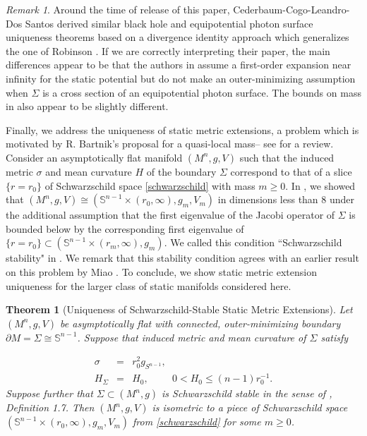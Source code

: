 \documentclass[12pt,twoside]{article}
\theoremstyle{plain}
\newtheorem{theorem}{Theorem}[section]
\theoremstyle{definition}
\theoremstyle{remark}
\newtheorem*{remark}{Remark}
\numberwithin{equation}{section}
\begin{document}
\begin{remark}
Around the time of release of this paper, Cederbaum-Cogo-Leandro-Dos Santos \cite{CCLS24} derived similar black hole and equipotential photon surface uniqueness theorems based on a divergence identity approach which generalizes the one of Robinson \cite{R78}. If we are correctly interpreting their paper, the main differences appear to be that the authors in \cite{CCLS24} assume a first-order expansion near infinity for the static potential but do not make an outer-minimizing assumption when $\Sigma$ is a cross section of an equipotential photon surface. The bounds on mass in \cite{CCLS24} also appear to be slightly different.
\end{remark}
Finally, we address the uniqueness of static metric extensions, a problem which is motivated by R. Bartnik's proposal for a quasi-local mass-- see \cite{Bar03} for a review. Consider an asymptotically flat manifold $(M^{n},g,V)$ such that the induced metric $\sigma$ and mean curvature $H$ of the boundary $\Sigma$ correspond to that of a slice $\{ r = r_{0}\}$ of Schwarzschild space \eqref{schwarzschild} with mass $m \geq 0$. In \cite{HW}, we showed that $(M^{n},g,V) \cong (\mathbb{S}^{n-1} \times (r_{0}, \infty), g_{m},V_{m})$ in dimensions less than $8$ under the additional assumption that the first eigenvalue of the Jacobi operator of $\Sigma$ is bounded below by the corresponding first eigenvalue of $\{r = r_{0} \} \subset (\mathbb{S}^{n-1} \times (r_{m},\infty), g_{m})$. We called this condition ``Schwarzschild stability" in \cite{HW}. We remark that this stability condition agrees with an earlier result on this problem by Miao \cite{boundary_effects}. To conclude, we show static metric extension uniqueness for the larger class of static manifolds considered here.
\begin{theorem}[Uniqueness of Schwarzschild-Stable Static Metric Extensions] \label{static_extension}
Let $(M^{n},g,V)$ be asymptotically flat  with connected, outer-minimizing boundary $\partial M=\Sigma \cong \mathbb{S}^{n-1}$. Suppose that induced metric and mean curvature of $\Sigma$ satisfy

\begin{eqnarray}
    \sigma &=& r_{0}^{2} g_{S^{n-1}},  \\
    H_{\Sigma} &=& H_{0}, \hspace{1cm} 0 < H_{0} \leq (n-1) r_{0}^{-1}.
\end{eqnarray}
Suppose further that $\Sigma \subset (M^{n},g)$ is Schwarzschild stable in the sense of \cite{HW}, Definition 1.7. Then $(M^{n},g,V)$ is isometric to a piece of Schwarzschild space $(\mathbb{S}^{n-1} \times (r_{0},\infty), g_{m},V_{m})$ from \eqref{schwarzschild} for some $m \geq 0$.
\end{theorem}
\end{document}
